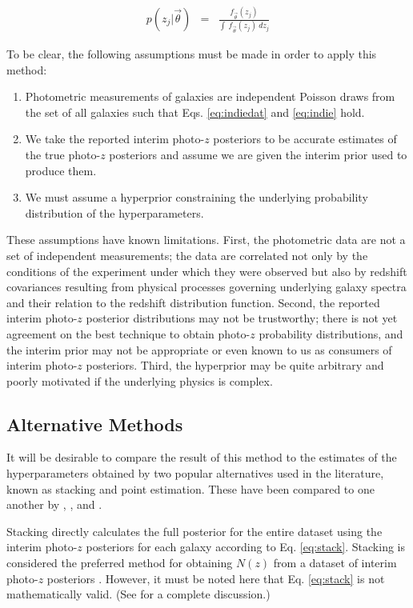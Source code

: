 \documentclass[preprint]{aastex}
\begin{document}
\begin{eqnarray}
\label{eq:params}
p(z_{j}|\vec{\theta}) &=& \frac{f_{\vec{\theta}}(z_{j})}{\int\ 
f_{\vec{\theta}}(z_{j})\ dz_{j}}
\end{eqnarray}

To be clear, the following assumptions must be made in order to apply this 
method:

\begin{enumerate}
\item Photometric measurements of galaxies are independent Poisson draws from 
the set of all galaxies such that Eqs. \ref{eq:indiedat} and \ref{eq:indie} 
hold.
\item We take the reported interim photo-$z$ posteriors to be accurate 
estimates of the true photo-$z$ posteriors and assume we are given the interim 
prior used to produce them.
\item We must assume a hyperprior constraining the underlying probability 
distribution of the hyperparameters.
\end{enumerate}

These assumptions have known limitations.  First, the photometric data are not 
a set of independent measurements; the data are correlated not only by the 
conditions of the experiment under which they were observed but also by 
redshift covariances resulting from physical processes governing underlying 
galaxy spectra and their relation to the redshift distribution function.  
Second, the reported interim photo-$z$ posterior distributions may not be 
trustworthy; there is not yet agreement on the best technique to obtain 
photo-$z$ probability distributions, and the interim prior may not be 
appropriate or even known to us as consumers of interim photo-$z$ posteriors.  
Third, the hyperprior may be quite arbitrary and poorly motivated if the 
underlying physics is complex.

\clearpage
\subsection{Alternative Methods}
\label{sec:sheldon}

It will be desirable to compare the result of this method to the estimates of 
the hyperparameters obtained by two popular alternatives used in the 
literature, known as stacking and point estimation.   These have been compared 
to one another by \citet{Hildebrandt2012}, \citet{Benjamin2013}, and 
\citet{Asorey2016}.

Stacking directly calculates the full posterior for the entire dataset using 
the interim photo-$z$ posteriors for each galaxy according to Eq. 
\ref{eq:stack}\citep{Lima2008}.  Stacking is considered the preferred method 
for obtaining $N(z)$ from a dataset of interim photo-$z$ posteriors 
\citep{Sheldon2012, Kelly2014, Benjamin2013, Bonnett2015a, Viironen2015, 
Asorey2016}.  However, it must be noted here that Eq. \ref{eq:stack} is not 
mathematically valid.  (See \citet{Hogg2012} for a complete discussion.)  
\end{document}
